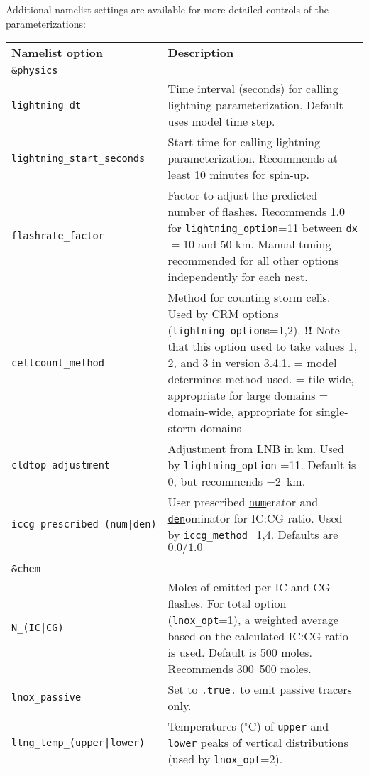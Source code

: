 \noindent Additional namelist settings are available for more detailed controls of the parameterizations:
\begin{center}
\begin{tabular}{p{2.1in}p{3.9in}}
	{\bf Namelist option} 		& {\bf Description} \\
	{\tt \&physics} & \\
	{\tt lightning\_dt} 			& Time interval (seconds) for calling lightning parameterization. Default uses model time step. \\
	{\tt lightning\_start\_seconds} 	& Start time for calling lightning parameterization. Recommends at least 10 minutes for spin-up.\\
	{\tt flashrate\_factor} 			& Factor to adjust the predicted number of flashes. Recommends 1.0 for {\tt lightning\_option}=11 between {\tt dx}$=$10 and 50 km. Manual tuning recommended for all other options independently for each nest. \\
	{\tt cellcount\_method} 		& Method for counting storm cells. Used by CRM options ({\tt lightning\_option}s=1,2). \textbf{!!} Note that this option used to take values 1, 2, and 3 in version 3.4.1. \newline 
							0 = model determines method used. \newline
							1 = tile-wide, appropriate for large domains \newline
							2 = domain-wide, appropriate for single-storm domains \\
	{\tt cldtop\_adjustment} 		& Adjustment from LNB in km. Used by {\tt lightning\_option} =11. Default is 0, but recommends $-2$~km.\\ 
	{\tt iccg\_prescribed\_(num|den)} & User prescribed {\tt\underline{num}}erator and {\tt\underline{den}}ominator for IC:CG ratio. Used by {\tt iccg\_method}=1,4. Defaults are $0.0/1.0$ \\ \\
	{\tt \&chem} & \\
	{\tt N\_(IC|CG)} 				& Moles of \chem{NO} emitted per IC and CG flashes. For total \chem{LNO_x} option ({\tt lnox\_opt}=1), a weighted average based on the calculated IC:CG ratio is used. Default is 500 moles. Recommends 300--500 moles. \\
	{\tt lnox\_passive} 			& Set to {\tt .true.} to emit passive tracers only. \\
	{\tt ltng\_temp\_(upper|lower)} 	& Temperatures ($^\circ$C) of {\tt upper} and {\tt lower} peaks of \chem{LNO_x} vertical distributions (used by {\tt lnox\_opt}=2). \\
\end{tabular}
\end{center}